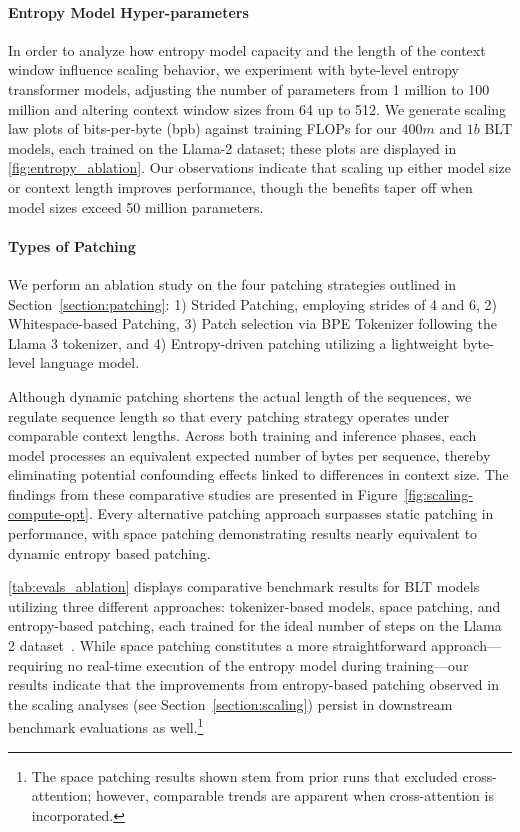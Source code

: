 \paragraph{Entropy Model Hyper-parameters} In order to analyze how entropy model capacity and the length of the context window influence scaling behavior, we experiment with byte-level entropy transformer models, adjusting the number of parameters from 1 million to 100 million and altering context window sizes from 64 up to 512. We generate scaling law plots of bits-per-byte (bpb) against training FLOPs for our $400m$ and $1b$ {\textsc BLT} models, each trained on the Llama-2 dataset; these plots are displayed in \autoref{fig:entropy_ablation}. Our observations indicate that scaling up either model size or context length improves performance, though the benefits taper off when model sizes exceed 50 million parameters.

\paragraph{Types of Patching}

We perform an ablation study on the four patching strategies outlined in Section~\ref{section:patching}: 1) Strided Patching, employing strides of 4 and 6, 2) Whitespace-based Patching, 3) Patch selection via BPE Tokenizer following the Llama 3 tokenizer, and 4) Entropy-driven patching utilizing a lightweight byte-level language model.

Although dynamic patching shortens the actual length of the sequences, we regulate sequence length so that every patching strategy operates under comparable context lengths. Across both training and inference phases, each model processes an equivalent expected number of bytes per sequence, thereby eliminating potential confounding effects linked to differences in context size. The findings from these comparative studies are presented in Figure~\ref{fig:scaling-compute-opt}. Every alternative patching approach surpasses static patching in performance, with space patching demonstrating results nearly equivalent to dynamic entropy based patching.

\autoref{tab:evals_ablation} displays comparative benchmark results for {\textsc BLT} models utilizing three different approaches: tokenizer-based models, space patching, and entropy-based patching, each trained for the ideal number of steps on the Llama 2 dataset~\citep{dubey2024llama}. While space patching constitutes a more straightforward approach—requiring no real-time execution of the entropy model during training—our results indicate that the improvements from entropy-based patching observed in the scaling analyses (see Section~\ref{section:scaling}) persist in downstream benchmark evaluations as well.\footnote{The space patching results shown stem from prior runs that excluded cross-attention; however, comparable trends are apparent when cross-attention is incorporated.}

